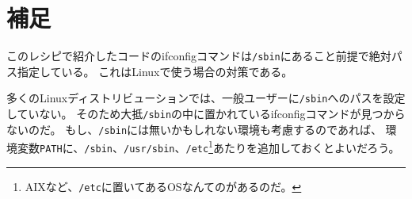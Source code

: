 \section*{補足}

このレシピで紹介したコードのifconfigコマンドは\verb|/sbin|にあること前提で絶対パス指定している。
これはLinuxで使う場合の対策である。

多くのLinuxディストリビューションでは、一般ユーザーに\verb|/sbin|へのパスを設定していない。
そのため大抵\verb|/sbin|の中に置かれているifconfigコマンドが見つからないのだ。
もし、\verb|/sbin|には無いかもしれない環境も考慮するのであれば、
環境変数\verb|PATH|に、\verb|/sbin|、\verb|/usr/sbin|、\verb|/etc|\footnote{AIXなど、\verb|/etc|に置いてあるOSなんてのがあるのだ。}あたりを追加しておくとよいだろう。 


